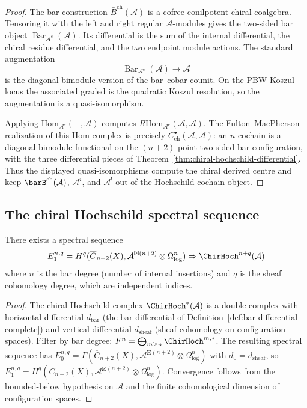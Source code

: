\begin{proof}
The bar construction $\bar{B}^{\mathrm{ch}}(\mathcal{A})$ is a
cofree conilpotent chiral coalgebra. Tensoring it with the left and
right regular $\mathcal{A}$-modules gives the two-sided bar object
$\operatorname{Bar}_{\mathcal{A}^{e}}(\mathcal{A})$. Its differential
is the sum of the internal differential, the chiral residue
differential, and the two endpoint module actions. The standard
augmentation
\[
\operatorname{Bar}_{\mathcal{A}^{e}}(\mathcal{A})
\longrightarrow \mathcal{A}
\]
is the diagonal-bimodule version of the bar--cobar counit. On the
PBW Koszul locus the associated graded is the quadratic Koszul
resolution, so the augmentation is a quasi-isomorphism.

Applying $\mathrm{Hom}_{\mathcal{A}^{e}}(-,\mathcal{A})$ computes
$R\mathrm{Hom}_{\mathcal{A}^{e}}(\mathcal{A},\mathcal{A})$. The
Fulton--MacPherson realization of this Hom complex is precisely
$C^{\bullet}_{\mathrm{ch}}(\mathcal{A},\mathcal{A})$: an $n$-cochain
is a diagonal bimodule functional on the $(n+2)$-point two-sided bar
configuration, with the three differential pieces of
Theorem~\ref{thm:chiral-hochschild-differential}. Thus the displayed
quasi-isomorphisms compute the chiral derived centre and keep
$\barB^{\mathrm{ch}}(\mathcal{A})$, $\mathcal{A}^{i}$, and
$\mathcal{A}^{!}$ out of the Hochschild-cochain object.
\end{proof}

\subsection{The chiral Hochschild spectral sequence}

\begin{theorem}\label{thm:hochschild-spectral-sequence}
There exists a spectral sequence
\[
E_1^{n,q} = H^q(\overline{C}_{n+2}(X), \mathcal{A}^{\boxtimes (n+2)} \otimes \Omega^n_{\log}) \Rightarrow \ChirHoch^{n+q}(\mathcal{A})
\]
where $n$ is the bar degree (number of internal insertions) and $q$ is the sheaf cohomology degree, which are independent indices.
\end{theorem}

\begin{proof}
The chiral Hochschild complex $\ChirHoch^*(\mathcal{A})$ is a double complex with horizontal differential $d_{\mathrm{bar}}$ (the bar differential of Definition~\ref{def:bar-differential-complete}) and vertical differential $d_{\mathrm{sheaf}}$ (sheaf cohomology on configuration spaces). Filter by bar degree: $F^n = \bigoplus_{m \geq n} \ChirHoch^{m,*}$. The resulting spectral sequence has $E_0^{n,q} = \Gamma(\overline{C}_{n+2}(X), \mathcal{A}^{\boxtimes(n+2)} \otimes \Omega^n_{\log})$ with $d_0 = d_{\mathrm{sheaf}}$, so $E_1^{n,q} = H^q(\overline{C}_{n+2}(X), \mathcal{A}^{\boxtimes(n+2)} \otimes \Omega^n_{\log})$. Convergence follows from the bounded-below hypothesis on $\mathcal{A}$ and the finite cohomological dimension of configuration spaces.
\end{proof}

